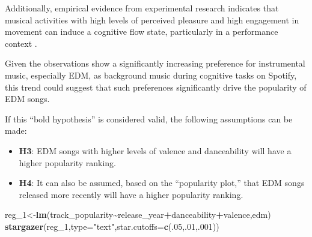 \documentclass[
]{book}
\newenvironment{Shaded}{\begin{snugshade}}{\end{snugshade}}
\newcommand{\AttributeTok}[1]{\textcolor[rgb]{0.13,0.29,0.53}{#1}}
\newcommand{\DecValTok}[1]{\textcolor[rgb]{0.00,0.00,0.81}{#1}}
\newcommand{\FunctionTok}[1]{\textcolor[rgb]{0.13,0.29,0.53}{\textbf{#1}}}
\newcommand{\NormalTok}[1]{#1}
\newcommand{\OtherTok}[1]{\textcolor[rgb]{0.56,0.35,0.01}{#1}}
\newcommand{\SpecialCharTok}[1]{\textcolor[rgb]{0.81,0.36,0.00}{\textbf{#1}}}
\newcommand{\StringTok}[1]{\textcolor[rgb]{0.31,0.60,0.02}{#1}}
\begin{document}
Additionally, empirical evidence from experimental research indicates that musical activities with high levels of perceived pleasure and high engagement in movement can induce a cognitive flow state, particularly in a performance context \citep[e.g.,][]{loepthien2022flow}.

Given the observations show a significantly increasing preference for instrumental music, especially EDM, as background music during cognitive tasks on Spotify\citep[e.g.,][]{NationalUniversity2021, Spotify2021}, this trend could suggest that such preferences significantly drive the popularity of EDM songs.

If this ``bold hypothesis'' is considered valid, the following assumptions can be made:

\begin{itemize}
\item
  \textbf{H3}: EDM songs with higher levels of valence and danceability will have a higher popularity ranking.
\item
  \textbf{H4}: It can also be assumed, based on the ``popularity plot,'' that EDM songs released more recently will have a higher popularity ranking.
\end{itemize}

\begin{Shaded}
\begin{Highlighting}[]
\NormalTok{reg\_1}\OtherTok{\textless{}{-}}\FunctionTok{lm}\NormalTok{(track\_popularity}\SpecialCharTok{\textasciitilde{}}\NormalTok{release\_year}\SpecialCharTok{+}\NormalTok{danceability}\SpecialCharTok{+}\NormalTok{valence,edm)}
\FunctionTok{stargazer}\NormalTok{(reg\_1,}\AttributeTok{type=}\StringTok{"text"}\NormalTok{,}\AttributeTok{star.cutoffs=}\FunctionTok{c}\NormalTok{(.}\DecValTok{05}\NormalTok{,.}\DecValTok{01}\NormalTok{,.}\DecValTok{001}\NormalTok{))}
\end{Highlighting}
\end{Shaded}
\end{document}
